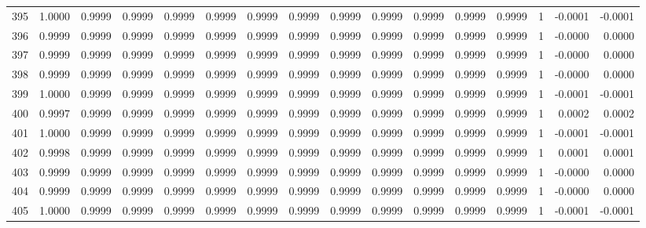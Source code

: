 \begin{tabular}{lrrrrrrrrrrrrrrr}
395 &      1.0000 &  0.9999 &  0.9999 &  0.9999 &  0.9999 &  0.9999 &  0.9999 &  0.9999 &  0.9999 &  0.9999 &   0.9999 &     0.9999 &      1 &                   -0.0001 &                    -0.0001 \\
396 &      0.9999 &  0.9999 &  0.9999 &  0.9999 &  0.9999 &  0.9999 &  0.9999 &  0.9999 &  0.9999 &  0.9999 &   0.9999 &     0.9999 &      1 &                   -0.0000 &                     0.0000 \\
397 &      0.9999 &  0.9999 &  0.9999 &  0.9999 &  0.9999 &  0.9999 &  0.9999 &  0.9999 &  0.9999 &  0.9999 &   0.9999 &     0.9999 &      1 &                   -0.0000 &                     0.0000 \\
398 &      0.9999 &  0.9999 &  0.9999 &  0.9999 &  0.9999 &  0.9999 &  0.9999 &  0.9999 &  0.9999 &  0.9999 &   0.9999 &     0.9999 &      1 &                   -0.0000 &                     0.0000 \\
399 &      1.0000 &  0.9999 &  0.9999 &  0.9999 &  0.9999 &  0.9999 &  0.9999 &  0.9999 &  0.9999 &  0.9999 &   0.9999 &     0.9999 &      1 &                   -0.0001 &                    -0.0001 \\
400 &      0.9997 &  0.9999 &  0.9999 &  0.9999 &  0.9999 &  0.9999 &  0.9999 &  0.9999 &  0.9999 &  0.9999 &   0.9999 &     0.9999 &      1 &                    0.0002 &                     0.0002 \\
401 &      1.0000 &  0.9999 &  0.9999 &  0.9999 &  0.9999 &  0.9999 &  0.9999 &  0.9999 &  0.9999 &  0.9999 &   0.9999 &     0.9999 &      1 &                   -0.0001 &                    -0.0001 \\
402 &      0.9998 &  0.9999 &  0.9999 &  0.9999 &  0.9999 &  0.9999 &  0.9999 &  0.9999 &  0.9999 &  0.9999 &   0.9999 &     0.9999 &      1 &                    0.0001 &                     0.0001 \\
403 &      0.9999 &  0.9999 &  0.9999 &  0.9999 &  0.9999 &  0.9999 &  0.9999 &  0.9999 &  0.9999 &  0.9999 &   0.9999 &     0.9999 &      1 &                   -0.0000 &                     0.0000 \\
404 &      0.9999 &  0.9999 &  0.9999 &  0.9999 &  0.9999 &  0.9999 &  0.9999 &  0.9999 &  0.9999 &  0.9999 &   0.9999 &     0.9999 &      1 &                   -0.0000 &                     0.0000 \\
405 &      1.0000 &  0.9999 &  0.9999 &  0.9999 &  0.9999 &  0.9999 &  0.9999 &  0.9999 &  0.9999 &  0.9999 &   0.9999 &     0.9999 &      1 &                   -0.0001 &                    -0.0001 \\

\end{tabular}
